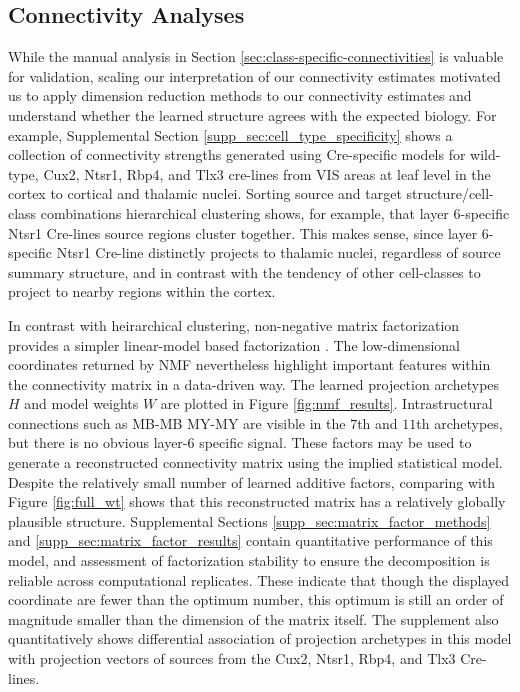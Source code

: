 \newpage

\subsection{Connectivity Analyses}

While the manual analysis in Section \ref{sec:class-specific-connectivities} is valuable for validation, scaling our interpretation of our connectivity estimates motivated us to apply dimension reduction methods to our connectivity estimates and understand whether the learned structure agrees with the expected biology.
For example,  Supplemental Section \ref{supp_sec:cell_type_specificity} shows a collection of connectivity strengths generated using Cre-specific models for wild-type, Cux2, Ntsr1, Rbp4, and Tlx3 cre-lines from VIS areas at leaf level in the cortex to cortical and thalamic nuclei.
Sorting source and target structure/cell-class combinations hierarchical clustering shows, for example, that layer 6-specific Ntsr1 Cre-lines source regions cluster together.
This makes sense, since layer 6-specific Ntsr1 Cre-line distinctly projects to thalamic nuclei, regardless of source summary structure, and in contrast with the tendency of other cell-classes to project to nearby regions within the cortex.

In contrast with heirarchical clustering, non-negative matrix factorization provides a simpler linear-model based factorization \citep{Hastie_2009}.
The low-dimensional coordinates returned by NMF nevertheless highlight important features within the connectivity matrix in a data-driven way.
The learned projection archetypes $H$ and model weights $W$ are plotted in Figure \ref{fig:nmf_results}.
Intrastructural connections such as MB-MB MY-MY are visible in the $7$th and $11$th archetypes, but there is no obvious layer-6 specific signal.
These factors may be used to generate a reconstructed connectivity matrix using the implied statistical model.
Despite the relatively small number of learned additive factors, comparing with Figure \ref{fig:full_wt} shows that this reconstructed matrix has a relatively globally plausible structure.
Supplemental Sections \ref{supp_sec:matrix_factor_methods} and \ref{supp_sec:matrix_factor_results} contain quantitative performance of this model, and assessment of factorization stability to ensure the decomposition is reliable across computational replicates.
These indicate that though the displayed coordinate are fewer than the optimum number, this optimum is still an order of magnitude smaller than the dimension of the matrix itself.
The supplement also quantitatively shows differential association of projection archetypes in this model with projection vectors of sources from the Cux2, Ntsr1, Rbp4, and Tlx3 Cre-lines.


